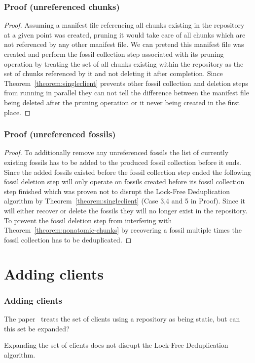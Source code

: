 \documentclass[english,utf8,aspectratio=169]{beamer}
\begin{document}
    \begin{frame}
        \frametitle{Proof (unreferenced chunks)}
        \begin{proof}
            Assuming a manifest file referencing all chunks existing in the repository at a given
            point was created, pruning it would take care of all chunks which are not referenced
            by any other manifest file.
            We can pretend this manifest file was created and perform the fossil collection step
            associated with its pruning operation by treating the set of all chunks existing within
            the repository as the set of chunks referenced by it and not deleting it after completion.
            Since Theorem~\ref{theorem:singleclient} prevents other fossil collection and deletion
            steps from running in parallel they can not tell the difference between the manifest file
            being deleted after the pruning operation or it never being created in the first
            place.
        \end{proof}
    \end{frame}

    \begin{frame}
        \frametitle{Proof (unreferenced fossils)}
        \begin{proof}
            To additionally remove any unreferenced fossils the list of currently existing fossils
            has to be added to the produced fossil collection before it ends.
            Since the added fossils existed before the fossil collection step ended the following
            fossil deletion step will only operate on fossils created before its fossil collection
            step finished which was proven not to disrupt the Lock-Free Deduplication algorithm
            by Theorem~\ref{theorem:singleclient} (Case 3,4 and 5 in Proof).
            Since it will either recover or delete the fossils they will no longer exist in the
            repository.
            To prevent the fossil deletion step from interfering with Theorem~\ref{theorem:nonatomic-chunks}
            by recovering a fossil multiple times the fossil collection has to be deduplicated.
        \end{proof}
    \end{frame}

    \section{Adding clients}
    \begin{frame}
        \frametitle{Adding clients}
        The paper~\cite{Duplicacy} treats the set of clients using a repository as being static,
        but can this set be expanded?
        \begin{theorem}
            Expanding the set of clients does not disrupt the Lock-Free Deduplication algorithm. 
        \end{theorem}
    \end{frame}
\end{document}
